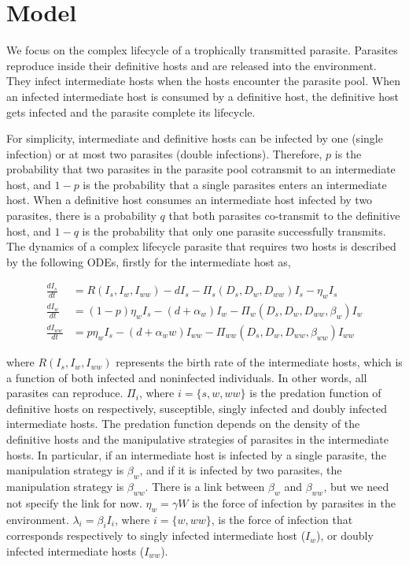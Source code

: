 \documentclass{article}
\begin{document}
\section{Model}
We focus on the complex lifecycle of a trophically transmitted parasite. 
Parasites reproduce inside their definitive hosts and are released into the environment. 
They infect intermediate hosts when the hosts encounter the parasite pool. 
When an infected intermediate host is consumed by a definitive host, the definitive host gets infected and the parasite complete its lifecycle.

For simplicity, intermediate and definitive hosts can be infected by one (single infection) or at most two parasites (double infections). 
Therefore, $p$ is the probability that two parasites in the parasite pool cotransmit to an intermediate host, and $1-p$ is the probability that a single parasites enters an intermediate host. 
When a definitive host consumes an intermediate host infected by two parasites, there is a probability $q$ that both parasites co-transmit to the definitive host, and $1-q$ is the probability that only one parasite successfully transmits. 
The dynamics of a complex lifecycle parasite that requires two hosts is described by the following ODEs, firstly for the intermediate host as,

\begin{align}
\frac{dI_s}{dt} &= R(I_s, I_w, I_{ww}) - d I_s - \Pi_s(D_s, D_w, D_{ww}) I_s  - \eta_w  I_s \nonumber \\ 
\frac{dI_w}{dt} &=  (1 - p) \eta_w I_s  - (d + \alpha_w) I_w - \Pi_w(D_s, D_w, D_{ww}, \beta_w) I_w \\
\frac{dI_{ww}}{dt} &= p \eta_w I_s  - (d + \alpha_ww) I_{ww} - \Pi_{ww}(D_s, D_w, D_{ww}, \beta_{ww}) I_{ww} \nonumber
\end{align}

where  $R(I_s, I_w, I_{ww})$ represents the birth rate of the intermediate hosts, which is a function of both infected and noninfected individuals. 
In other words, all parasites can reproduce. 
$\Pi_i$, where $i = \{s, w, ww\}$ is the predation function of definitive hosts on respectively, susceptible, singly infected and doubly infected intermediate hosts. 
The predation function depends on the density of the definitive hosts and the manipulative strategies of parasites in the intermediate hosts. 
In particular, if an intermediate host is infected by a single parasite, the manipulation strategy is $\beta_w$, and if it is infected by two parasites, the manipulation strategy is $\beta_{ww}$. 
There is a link between $\beta_w$ and $\beta_{ww}$, but we need not specify the link for now. 
$\eta_w = \gamma W$ is the force of infection by parasites in the environment. 
$\lambda_i = \beta_i I_i$, where $i = \{ w, ww\}$, is the force of infection that corresponds respectively to singly infected intermediate host ($I_w$), or doubly infected intermediate hosts ($I_{ww}$). 
\end{document}
